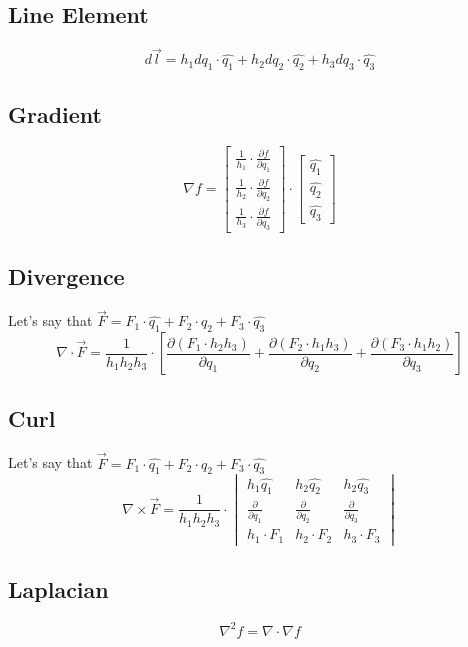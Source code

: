 \documentclass[a4paper]{report}
\begin{document}
\subsection{Line Element}
$$d\vec{l}=h_1dq_1\cdot\hat{q_1}+h_2dq_2\cdot\hat{q_2}+h_3dq_3\cdot\hat{q_3}$$
\subsection{Gradient}
\renewcommand{\arraystretch}{2}
$$
\nabla f=
\begin{bmatrix}
    \frac{1}{h_1}\cdot\frac{\partial f}{\partial q_1}\\
    \frac{1}{h_2}\cdot\frac{\partial f}{\partial q_2}\\
    \frac{1}{h_3}\cdot\frac{\partial f}{\partial q_3}
\end{bmatrix}\cdot
\begin{bmatrix}
    \hat{q_1}\\
    \hat{q_2}\\
    \hat{q_3}
\end{bmatrix}
$$
\subsection{Divergence}
Let's say that $\vec{F}=F_1\cdot\hat{q_1}+F_2\cdot\hat{q_2}+F_3\cdot\hat{q_3}$
$$
\nabla\cdot\vec{F}=
\frac{1}{h_1h_2h_3}\cdot
\left[
    \frac{\partial
    \left(
        F_1\cdot h_2 h_3
    \right)}{\partial q_1}
    +
    \frac{\partial
    \left(
        F_2\cdot h_1 h_3
    \right)}{\partial q_2}
    +
    \frac{\partial
    \left(
        F_3\cdot h_1 h_2
    \right)}{\partial q_3}
\right]
$$
\subsection{Curl}
Let's say that $\vec{F}=F_1\cdot\hat{q_1}+F_2\cdot\hat{q_2}+F_3\cdot\hat{q_3}$
$$
\nabla\times\vec{F}=
\frac{1}{h_1h_2h_3}
\cdot
\begin{vmatrix}
    h_1\hat{q_1}&h_2\hat{q_2}&h_2\hat{q_3}\\
    \frac{\partial}{\partial q_1}&\frac{\partial}{\partial q_2}&\frac{\partial}{\partial q_3}\\
    h_1\cdot F_1&h_2\cdot F_2&h_3\cdot F_3
\end{vmatrix}
$$
\subsection{Laplacian}
$$ 
    \nabla^2 f = \nabla\cdot\nabla f
$$
\end{document}
